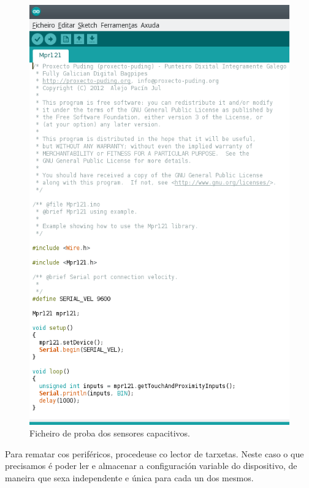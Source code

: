    \begin{figure}[htbp]
    \centering
    \includegraphics[scale=0.8,keepaspectratio=true]{./imagenes/test-sensores-capacitivos.png}
    \caption{Ficheiro de proba dos sensores capacitivos.}
    \label{figura:TestSensoresCapacitivos}
   \end{figure}
   
   Para rematar cos periféricos, procedeuse co lector de tarxetas. Neste caso o
   que precisamos é poder ler e almacenar a configuración variable do
   dispositivo, de maneira que sexa independente e única para cada un dos
   mesmos. \\
   
